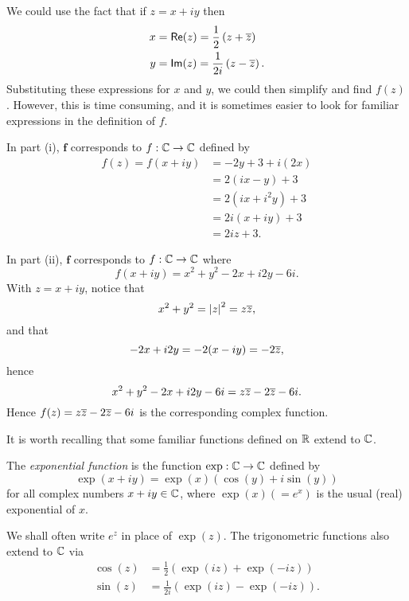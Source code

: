 \begin{solution}
We could use the fact that if $z=x+iy$ then
\begin{align*}
x & = \textsf{Re}(z) = \frac{1}{2} \left( z+ \overline{z} \right) \\
y & = \textsf{Im} (z) = \frac{1}{2i} \left( z- \overline{z} \right).
\end{align*}
Substituting these expressions for $x$ and $y$, we could then simplify and find $f(z)$. However, this is time consuming, and it is sometimes easier to look for familiar expressions in the definition of $f$.

In part (i), $\mathbf{f}$ corresponds to $f: \mathbb{C} \to \mathbb{C}$ defined by
\begin{align*}
f(z) = f(x+iy) &= -2y+3+i(2x) \\
& = 2(ix-y) + 3 \\
& = 2(ix+i^2y)+3 \\
& = 2i(x+iy)+3 \\
& = 2iz+3.
\end{align*}

In part (ii), $\mathbf{f}$ corresponds to $f:\mathbb{C} \to \mathbb{C}$ where
\[
f(x+iy) = x^2+y^2-2x+i2y-6i.
\]
With $z=x+iy$, notice that
\[
x^2+y^2=\left| z \right|^2 = z \overline{z},
\]
and that
\[
-2x+i2y = -2 (x-iy) = -2 \overline{z},
\]
hence
\[
x^2+y^2-2x+i2y-6i = z \overline{z} - 2 \overline{z} -6i.
\]
Hence $f(z) = z \overline{z}-2\overline{z}-6i$ is the corresponding complex function.



\end{solution}




It is worth recalling that some familiar functions defined on $\mathbb{R}$ extend to $\mathbb{C}$.

\begin{definition}
\label{d:exp}
The \emph{exponential function} is the function $\exp : \mathbb{C} \to \mathbb{C}$ defined by
\[
\exp (x+iy) = \exp(x) \left( \cos (y) + i \sin (y) \right)
\]
for all complex numbers $x+iy \in \mathbb{C}$, where $\exp (x) (=e^x)$ is the usual (real) exponential of $x$.
\end{definition}
We shall often write $e^z$ in place of $\exp (z)$.   The trigonometric functions also extend to $\mathbb{C}$ via
\begin{align}
\cos (z) &= \frac{1}{2} \left( \exp (iz) + \exp (-iz) \right) \\
\sin (z) & = \frac{1}{2i} \left( \exp(iz)- \exp (-iz) \right).
\end{align}





